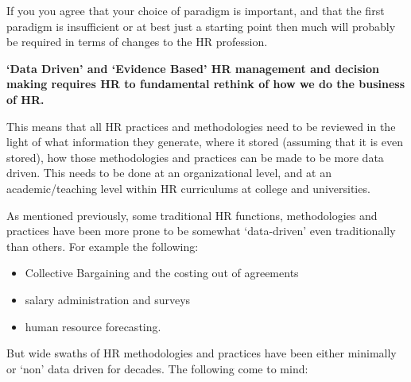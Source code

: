 \documentclass[12pt,letterpaper]{article}
\begin{document}
If you you agree that your choice of paradigm is important, and that the
first paradigm is insufficient or at best just a starting point then
much will probably be required in terms of changes to the HR profession.

\textbf{`Data Driven' and `Evidence Based' HR management and decision
making requires HR to fundamental rethink of how we do the business of
HR.}

This means that all HR practices and methodologies need to be reviewed
in the light of what information they generate, where it stored
(assuming that it is even stored), how those methodologies and practices
can be made to be more data driven. This needs to be done at an
organizational level, and at an academic/teaching level within HR
curriculums at college and universities.

As mentioned previously, some traditional HR functions, methodologies
and practices have been more prone to be somewhat `data-driven' even
traditionally than others. For example the following:

\begin{itemize}
\item
  Collective Bargaining and the costing out of agreements
\item
  salary administration and surveys
\item
  human resource forecasting.
\end{itemize}

But wide swaths of HR methodologies and practices have been either
minimally or `non' data driven for decades. The following come to mind:
\end{document}
